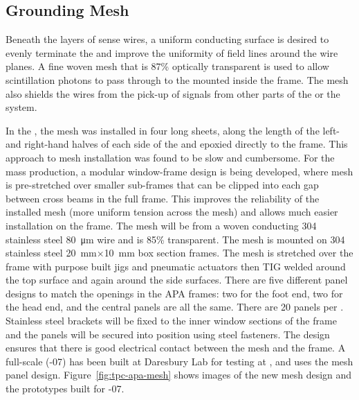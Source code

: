 \subsection{Grounding Mesh}
\label{sec:fdsp-apa-mesh}

Beneath the layers of sense wires, a uniform conducting surface is desired to evenly terminate the \efield and improve the uniformity of field lines around the wire planes. A fine woven mesh that is \num{87}\% optically transparent is used to allow scintillation photons to pass through to the  mounted inside the frame.  The mesh also shields the  wires from the pick-up of signals from other parts of the  or the  system.  

In the  , the mesh was installed in four long sheets, along the length of the left- and right-hand halves of each side of the  and epoxied directly to the frame. This approach to mesh installation was found to be slow and cumbersome.  For the  mass production, a modular window-frame design is being developed, where mesh is pre-stretched over smaller sub-frames that can be clipped into each gap between cross beams in the full  frame.   This improves the reliability of the installed mesh (more uniform tension across the mesh) and allows much easier installation on the  frame. The mesh will be from a woven conducting 304 stainless steel \SI{80}{\um} wire and is 85\% transparent. The mesh is mounted on 304 stainless steel \SI{20}{mm}$\times$\SI{10}{mm} box section frames. The mesh is stretched over the frame with purpose built jigs and pneumatic actuators then TIG welded around the top surface and again around the side surfaces. There are five different panel designs to match the openings in the APA frames: two for the foot end, two for the head end, and the central panels are all the same. There are 20 panels per . Stainless steel brackets will be fixed to the inner window sections of the  frame and the panels will be secured into position using steel fasteners. The design ensures that there is good electrical contact between the mesh and the frame. A full-scale  (-07) has been built at Daresbury Lab for  testing at , and uses the mesh panel design. Figure~\ref{fig:tpc-apa-mesh} shows images of the new mesh design and the prototypes built for -07.

